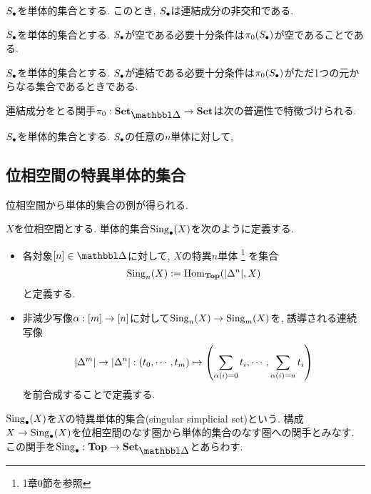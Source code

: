 \documentclass[uplatex, a4paper, 14Q, dvipdfmx]{jsreport}
\begin{document}
\begin{Proof}
  
\end{Proof}

\begin{prop}
  $\S$を単体的集合とする. 
  このとき, $\S$は連結成分の非交和である. 
\end{prop}

\begin{Proof}

\end{Proof}

\begin{cor}
  $\S$を単体的集合とする. 
  $\S$が空である必要十分条件は$\pi_0(\S)$が空であることである. 
\end{cor}

\begin{cor}
  $\S$を単体的集合とする. 
  $\S$が連結である必要十分条件は$\pi_0(\S)$がただ1つの元からなる集合であるときである.
\end{cor}

\begin{exe}
  
\end{exe}

連結成分をとる関手$\pi_0: \sset \to \cset$は次の普遍性で特徴づけられる. 

\begin{cons}
  $\S$を単体的集合とする. 
  $\S$の任意の$n$単体に対して, 
\end{cons}

\subsection{位相空間の特異単体的集合}

位相空間から単体的集合の例が得られる. 

\begin{cons}
  $X$を位相空間とする. 
  単体的集合$\Sing_\bullet(X)$を次のように定義する. 
  \begin{itemize}
    \item 各対象$[n] \in \csim$に対して, $X$の特異$n$単体
    \footnote{
      1章0節を参照
    }
    を集合
    \begin{align*}
      \Sing_n(X):=\Hom_{\Top}(|\Delta^n|,X)
    \end{align*}
    と定義する. 
    \item 非減少写像$\al: [m] \to [n]$に対して$\Sing_n(X) \to \Sing_m(X)$を, 誘導される連続写像
    \begin{align*}
      |\Delta^m| \to |\Delta^n|: (t_0,\cdots,t_m) \mt \qty(\sum_{\al(i)=0}t_i,\cdots,\sum_{\al(i)=n}t_i) 
    \end{align*}
    を前合成することで定義する. 
  \end{itemize}
  $\Sing_\bullet(X)$を$X$の特異単体的集合(singular simplicial set)という. 
  構成$X \to \Sing_\bullet(X)$を位相空間のなす圏から単体的集合のなす圏への関手とみなす. 
  この関手を$\Sing_\bullet: \Top \to \sset$とあらわす. 
\end{cons}
\end{document}
